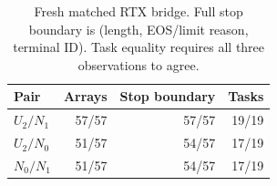 \begin{table}[t]
\centering
\caption{Fresh matched RTX bridge. Full stop boundary is (length, EOS/limit reason, terminal ID). Task equality requires all three observations to agree.}
\label{tab:bridge}
\begin{tabular}{@{}lrrr@{}}
\toprule
Pair & Arrays & Stop boundary & Tasks \\
\midrule
$U_2/N_1$ & 57/57 & 57/57 & 19/19 \\
$U_2/N_0$ & 51/57 & 54/57 & 17/19 \\
$N_0/N_1$ & 51/57 & 54/57 & 17/19 \\
\bottomrule
\end{tabular}
\end{table}
